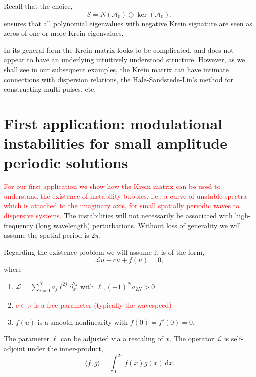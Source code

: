 \documentclass[review,onefignum,onetabnum]{siamart171218}
\newcommand{\R}{\mathbb{R}}
\def\ker{\mathop\mathrm{ker}\nolimits}
\newcommand{\rmd}{\mathrm{d}}
\newcommand{\calA}{\mathcal{A}}
\newcommand{\calL}{\mathcal{L}}
\newcommand{\revised}[1]{ \textcolor{red}{#1} }
\begin{document}
\begin{remark}
Recall that the choice,
\[
S=N(\calA_0)\oplus\ker(\calA_0),
\]
ensures that all polynomial eigenvalues with negative Krein signature are seen as zeros of one or more Krein eigenvalues.
\end{remark}
%
%

In its general form the Krein matrix looks to be complicated, and does not appear to have an underlying intuitively understood structure.  However, as we shall see in our subsequent examples, the Krein matrix can have intimate connections with dispersion relations, the Hale-Sandstede-Lin's method for constructing multi-pulses, etc.

\section{First application: modulational instabilities for small amplitude periodic solutions}\label{s:4}

\revised{
For our first application we show how the Krein matrix can be used to understand the existence of
instability bubbles, i.e., a curve of unstable spectra which is attached to the imaginary axis, for small spatially periodic waves to dispersive systems.
}
The instabilities will not necessarily be associated with high-frequency
(long wavelength) perturbations. Without loss of generality we will assume the spatial period is $2\pi$.

Regarding the existence problem we will assume it is of the form,
\begin{equation}\label{e:51}
\calL u-cu+f(u)=0,
\end{equation}
where
\begin{enumerate}
\item $\displaystyle{\calL=\sum_{j=0}^Na_j\ell^{2j}\partial_x^{2j}}$ with
    $\ell,(-1)^Na_{2N}>0$
\item \revised{ $c\in\R$ is a free parameter (typically the wavespeed) }
\item $f(u)$ is a smooth nonlinearity with $f(0)=f'(0)=0$.
\end{enumerate}
The parameter $\ell$ can be adjusted via a rescaling of $x$.
The operator $\calL$ is self-adjoint under the inner-product,
\[
\langle f,g\rangle=\int_0^{2\pi}f(x)\overline{g(x)}\,\rmd x.
\]
\end{document}
